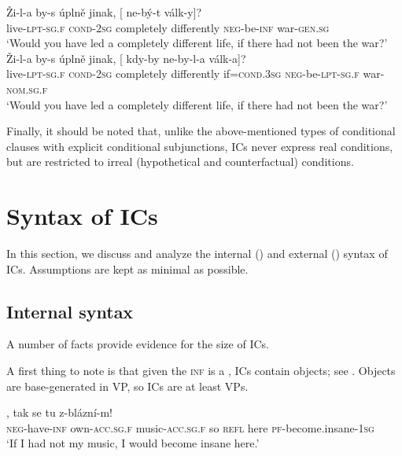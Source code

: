 \documentclass[output=paper,colorlinks,citecolor=brown,newtxmath]{langsci/langscibook}
\begin{document}
\begin{enumerate}
\ea\label{ex:war2}
\ea
\gll Ži-l-a by-s úplně jinak, [\hspace{-2pt} ne-bý-t válk-y]?\\
     live-\textsc{lpt-sg.f} \textsc{cond-2sg} completely differently {} \textsc{neg}-be-\textsc{inf} war-\textsc{gen.sg}\\
\glt `Would you have led a completely different life, if there had not been the war?'
\ex
\gll Ži-l-a by-s úplně jinak, [\hspace{-2pt} kdy-by ne-by-l-a válk-a]?\\
     live-\textsc{lpt-sg.f} \textsc{cond-2sg} completely differently  {} if=\textsc{cond.3sg} \textsc{neg}-be-\textsc{lpt-sg.f} war-\textsc{nom.sg.f}\\
\glt `Would you have led a completely different life, if there had not been the war?'
\z
\z

Finally, it should be noted that, unlike the above-mentioned types of conditional clauses with explicit conditional subjunctions, ICs never express real conditions, but are restricted to irreal (hypothetical and counterfactual) conditions.

\end{enumerate}


\section{Syntax of ICs}\label{sec:syntax}

In this section, we discuss and analyze the internal () and external () syntax of  ICs. Assumptions are kept as minimal as possible.

\subsection{Internal syntax}\label{sec:syntax_internal}

A number of facts provide evidence for the size of ICs.

A first thing to note is that given the \textsc{inf} is a , ICs contain objects; see . Objects are base-generated in VP, so ICs are at least VPs.

\ea\label{ex:music2}
, tak se tu z-blázní-m!\\
     {} \textsc{neg}-have-\textsc{inf} own-\textsc{acc.sg.f} music-\textsc{acc.sg.f} so \textsc{refl} here \textsc{pf}-{become.insane}-\textsc{1sg}\\
\glt `If I had not my music, I would become insane here.' \\ \hfill \citep[;][4]{Milotova2012}
\z
\end{document}
